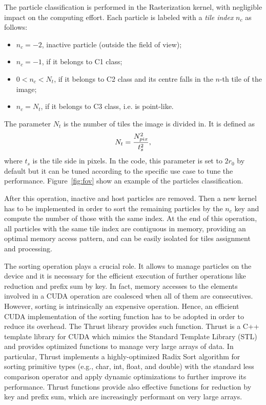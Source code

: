 \documentclass[11pt]{article}
\begin{document}
The particle classification is performed in the Rasterization kernel, with negligible impact
on the computing effort. Each particle is labeled
with a {\it tile index} $n_c$ as follows:
\begin{itemize}
\item 
$n_c = -2$, inactive particle (outside the field of view);
\item
$n_c = -1$, if it belongs to C1 class; 
\item
$0 < n_c < N_t$, if it belongs to C2 class and its centre falls in the $n$-th tile of the image;  
\item
$n_c = N_t$, if it belongs to C3 class, i.e. is point-like.
\end{itemize}
The parameter $N_t$ is the number of tiles the image is divided in. It is defined as
\begin{equation}
N_t = {N_{pix}^2\over t_s^2},   
\end{equation}
where $t_s$ is the tile side in pixels. In the code, this parameter is set to $2r_0$ 
by default but it can be tuned according to the specific use case to tune the performance. 
Figure~\ref{fig:fov} show an example of the particles classification. 

After this operation, inactive and host particles are removed. Then a new kernel has to be implemented in order to sort the remaining particles by the $n_c$ key and compute the number of those with the same index. 
At the end of this operation, all particles with the same tile index are contiguous in memory, providing an optimal memory access pattern, and can be easily isolated for tiles assignment and processing.

The sorting operation plays a crucial role. It allows to manage particles on the 
device and it is necessary for the efficient execution of further operations like 
reduction and prefix sum by key. In fact, memory accesses to the elements involved 
in a CUDA operation are coalesced when all of them are consecutives. However, sorting 
is intrinsically an expensive operation. Hence, an efficient CUDA implementation of
the sorting function has to be adopted in order to reduce its overhead. 
The Thrust library \cite{thrusturl} provides such function. Thrust is a C++ template library 
for CUDA which mimics the Standard Template Library (STL) and provides 
optimized functions to manage very large arrays of data. In particular, Thrust 
implements a highly-optimized Radix Sort algorithm for sorting primitive types
(e.g., char, int, float, and double) with the standard less comparison operator and 
apply dynamic optimizations to further improve its performance.
Thrust functions provide also effective functions for reduction by key and prefix sum, which are 
increasingly performant on very large arrays.
\end{document}
